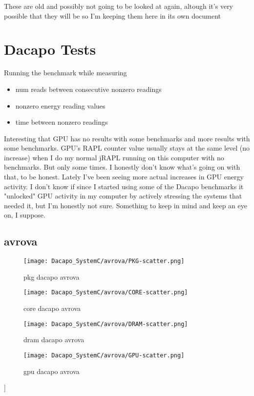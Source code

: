 \documentclass{article}
\begin{document}
These are old and possibly not going to be looked at again, altough
it's very possible that they will be so I'm keeping them here in
its own document

\section{Dacapo Tests}
Running the benchmark while measuring
\begin{itemize}
\item num reads between consecutive nonzero readings
\item nonzero energy reading values
\item time between nonzero readings
\end{itemize}

Interesting that GPU has no results with some benchmarks and more results with some benchmarks. GPU's RAPL counter
value usually stays at the same level (no increase) when I do my normal jRAPL running on this computer with no
benchmarks. But only some times. I honestly don't know what's going on with that, to be honest. Lately
I've been seeing more actual increases in GPU energy activity. I don't know if since I started using some of
the Dacapo benchmarks it "unlocked" GPU activity in my computer by actively stressing the systems that needed it,
but I'm honestly not sure. Something to keep in mind and keep an eye on, I suppose.

\subsection{avrova}
    
    \begin{figure}[H]
    	\centering
    	\texttt{[image: Dacapo\_SystemC/avrova/PKG-scatter.png]}
    	\caption{pkg dacapo avrova}
    	\label{fig:avrova-PKG}
    \end{figure}

    \begin{figure}[H]
    	\centering
    	\texttt{[image: Dacapo\_SystemC/avrova/CORE-scatter.png]}
    	\caption{core dacapo avrova}
    	\label{fig:avrova-CORE}
    \end{figure}
    \begin{figure}[H]
    	\centering
    	\texttt{[image: Dacapo\_SystemC/avrova/DRAM-scatter.png]}
    	\caption{dram dacapo avrova}
    	\label{fig:avrova-DRAM}
    \end{figure}
    \begin{figure}[H]
    	\centering
    	\texttt{[image: Dacapo\_SystemC/avrova/GPU-scatter.png]}
    	\caption{gpu dacapo avrova}
    	\label{fig:avrova-GPU}
    \end{figure}
  ]
\end{document}
